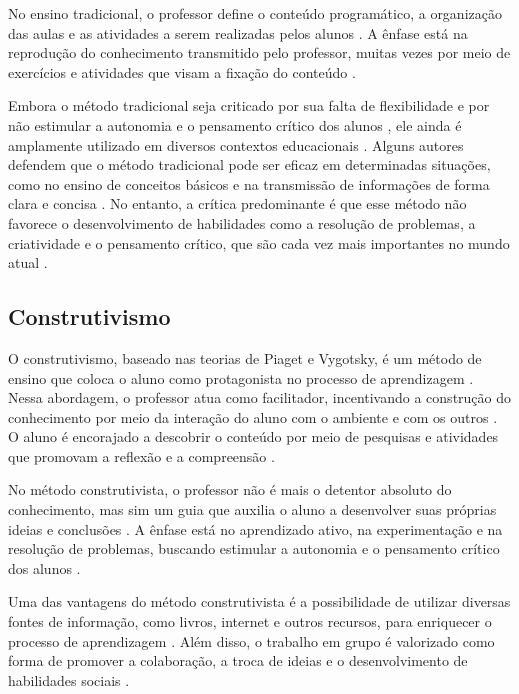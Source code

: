 No ensino tradicional, o professor define o conteúdo programático, a organização das aulas e as atividades a serem realizadas pelos alunos \cite{santos2011}. A ênfase está na reprodução do conhecimento transmitido pelo professor, muitas vezes por meio de exercícios e atividades que visam a fixação do conteúdo \cite{pinho2010}.

Embora o método tradicional seja criticado por sua falta de flexibilidade e por não estimular a autonomia e o pensamento crítico dos alunos \cite{backes2010}, ele ainda é amplamente utilizado em diversos contextos educacionais \cite{teofilo2009}. Alguns autores defendem que o método tradicional pode ser eficaz em determinadas situações, como no ensino de conceitos básicos e na transmissão de informações de forma clara e concisa \cite{oliveira2012}. No entanto, a crítica predominante é que esse método não favorece o desenvolvimento de habilidades como a resolução de problemas, a criatividade e o pensamento crítico, que são cada vez mais importantes no mundo atual \cite{haddadetal1993}.

\subsection{Construtivismo}
O construtivismo, baseado nas teorias de Piaget e Vygotsky, é um método de ensino que coloca o aluno como protagonista no processo de aprendizagem \cite{coria-sabini2003,gomesbellini2009}. Nessa abordagem, o professor atua como facilitador, incentivando a construção do conhecimento por meio da interação do aluno com o ambiente e com os outros \cite{haddadetal1993}. O aluno é encorajado a descobrir o conteúdo por meio de pesquisas e atividades que promovam a reflexão e a compreensão \cite{coria-sabini2003}.

No método construtivista, o professor não é mais o detentor absoluto do conhecimento, mas sim um guia que auxilia o aluno a desenvolver suas próprias ideias e conclusões \cite{coria-sabini2003}. A ênfase está no aprendizado ativo, na experimentação e na resolução de problemas, buscando estimular a autonomia e o pensamento crítico dos alunos \cite{pinho2010}.

Uma das vantagens do método construtivista é a possibilidade de utilizar diversas fontes de informação, como livros, internet e outros recursos, para enriquecer o processo de aprendizagem \cite{chahuanjimenez2009}. Além disso, o trabalho em grupo é valorizado como forma de promover a colaboração, a troca de ideias e o desenvolvimento de habilidades sociais \cite{cogo2006}.

